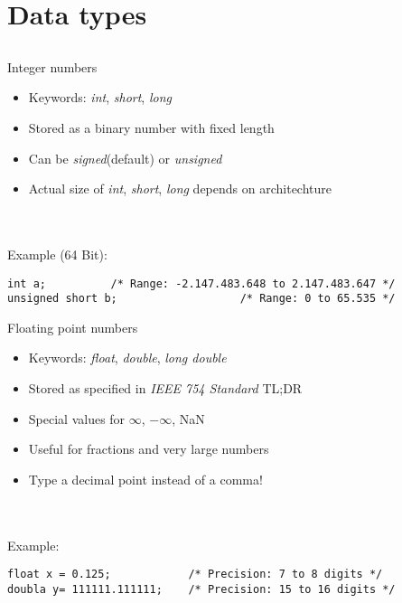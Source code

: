 \section{Data types}
\subsection{}
\begin{frame}[fragile]{Integer numbers}
	\begin{itemize}
		\item Keywords: \textit{int}, \textit{short}, \textit{long}
		\item Stored as a binary number with fixed length
		\item Can be \textit{signed}(default) or \textit{unsigned}
		\item Actual size of \textit{int}, \textit{short}, \textit{long} depends on architechture
	\end{itemize}\ \\
	\ \\
	Example (64 Bit):
	\begin{lstlisting}[numbers=none]
int a;			/* Range: -2.147.483.648 to 2.147.483.647 */
unsigned short b;					/* Range: 0 to 65.535 */
\end{lstlisting}
\end{frame}
\begin{frame}[fragile]{Floating point numbers}
	\begin{itemize}
		\item Keywords: \textit{float}, \textit{double}, \textit{long double}
		\item Stored as specified in \textit{IEEE 754 Standard} TL;DR
		\item Special values for $\infty$, $-\infty$, NaN
		\item Useful for fractions and very large numbers
		\item Type a decimal point instead of a comma!
	\end{itemize}\ \\
	\ \\
	Example:
	\begin{lstlisting}[numbers=none]
float x = 0.125;			/* Precision: 7 to 8 digits */
doubla y= 111111.111111;	/* Precision: 15 to 16 digits */
\end{lstlisting}
\end{frame}

